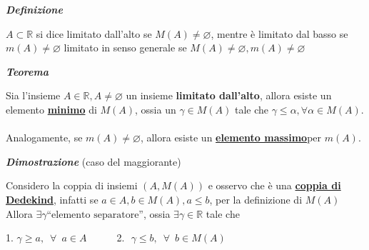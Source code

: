 \documentclass{article}
\theoremstyle{definition}
\newcommand{\R}{\mathbb{R}}
\newcommand{\virgolette}[1]{``#1''}
\begin{document}
\begin{center}


\end{center}
\begin{center}
    \textbf{\textit{Definizione}}
\end{center}
$A \subset \mathbb{R}$ si dice limitato dall'alto se $M(A)\neq \varnothing$, mentre è limitato dal basso se $m(A) \neq \varnothing $ limitato in senso generale se $M(A)\neq \varnothing , m(A)\neq \varnothing$
\begin{center}
    \textbf{\textit{Teorema}}
\end{center}
Sia l'insieme $A\in \R, A\neq \varnothing$ un insieme \textbf{limitato dall'alto}, allora esiste un elemento \textbf{\underline{minimo}} di $M(A)$, ossia un $\gamma \in M(A)$ tale che $\gamma \leqslant \alpha, \forall \alpha \in M(A)$.
\\
\\
Analogamente, se $m(A) \neq \varnothing$, allora esiste un \textbf{\underline{elemento massimo}}per $m(A)$.
\begin{center}
    \textbf{\textit{Dimostrazione}} (caso del maggiorante)
\end{center}
Considero la coppia di insiemi $(A,M(A))$ e osservo che è una \underline{\textbf{coppia di Dedekind}}, infatti se $a \in A, b \in M(A), a \leqslant b$, per la definizione di $M(A)$
\\
Allora $\exists \gamma \mbox{\virgolette{elemento separatore}}$, ossia $\exists \gamma \in \mathbb{R}$ tale che
\begin{center}
   1. $ \gamma \geqslant a, \,\,\, \forall \,\,\, a \in A $ \,\,\,\,\,\,\, \,\,\,\,\, 2. \,\,$\gamma \leqslant b, \,\,\, \forall \,\,\, b \in M(A)$
\end{center}
\end{document}
